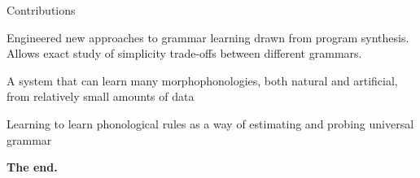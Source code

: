 \documentclass{beamer}
\begin{document}
\begin{frame}{Contributions}

  Engineered new approaches to grammar learning drawn from program synthesis. Allows exact study of simplicity trade-offs between different grammars.

  \vspace{1cm}
  
  A system that can learn many morphophonologies, both natural and artificial, from relatively small amounts of data

  \vspace{1cm}
  
  Learning to learn phonological rules as a way of estimating and probing universal grammar

  \pause

  \vspace{1cm}
  

  \textbf{The end.}
  
\end{frame}
\end{document}
